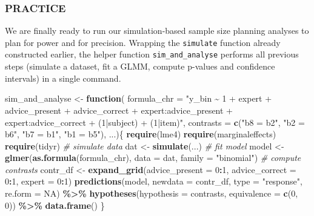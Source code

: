 \documentclass[
  man,floatsintext]{apa6}
\newenvironment{Shaded}{\begin{snugshade}}{\end{snugshade}}
\newcommand{\AttributeTok}[1]{\textcolor[rgb]{0.13,0.29,0.53}{#1}}
\newcommand{\CommentTok}[1]{\textcolor[rgb]{0.56,0.35,0.01}{\textit{#1}}}
\newcommand{\ConstantTok}[1]{\textcolor[rgb]{0.56,0.35,0.01}{#1}}
\newcommand{\ControlFlowTok}[1]{\textcolor[rgb]{0.13,0.29,0.53}{\textbf{#1}}}
\newcommand{\DecValTok}[1]{\textcolor[rgb]{0.00,0.00,0.81}{#1}}
\newcommand{\FunctionTok}[1]{\textcolor[rgb]{0.13,0.29,0.53}{\textbf{#1}}}
\newcommand{\NormalTok}[1]{#1}
\newcommand{\OtherTok}[1]{\textcolor[rgb]{0.56,0.35,0.01}{#1}}
\newcommand{\SpecialCharTok}[1]{\textcolor[rgb]{0.81,0.36,0.00}{\textbf{#1}}}
\newcommand{\StringTok}[1]{\textcolor[rgb]{0.31,0.60,0.02}{#1}}
\begin{document}
\hypertarget{practice-8}{%
\subsubsection{PRACTICE}\label{practice-8}}

We are finally ready to run our simulation-based sample size planning analyses to plan for power and for precision. Wrapping the \texttt{simulate} function already constructed earlier, the helper function \texttt{sim\_and\_analyse} performs all previous steps (simulate a dataset, fit a GLMM, compute p-values and confidence intervals) in a single command.

\begin{Shaded}
\begin{Highlighting}[]
\NormalTok{sim\_and\_analyse }\OtherTok{\textless{}{-}} \ControlFlowTok{function}\NormalTok{(}
  \AttributeTok{formula\_chr =} \StringTok{"y\_bin \textasciitilde{} 1 + expert + advice\_present + advice\_correct + }
\StringTok{    expert:advice\_present + expert:advice\_correct + (1|subject) + (1|item)"}\NormalTok{,}
  \AttributeTok{contrasts =} \FunctionTok{c}\NormalTok{(}\StringTok{"b8 = b2"}\NormalTok{, }\StringTok{"b2 = b6"}\NormalTok{, }\StringTok{"b7 = b1"}\NormalTok{, }\StringTok{"b1 = b5"}\NormalTok{), ...)\{}
  \FunctionTok{require}\NormalTok{(lme4)}
  \FunctionTok{require}\NormalTok{(marginaleffects)}
  \FunctionTok{require}\NormalTok{(tidyr)}
  \CommentTok{\# simulate data}
\NormalTok{  dat }\OtherTok{\textless{}{-}} \FunctionTok{simulate}\NormalTok{(...)}
  \CommentTok{\# fit model}
\NormalTok{  model }\OtherTok{\textless{}{-}} \FunctionTok{glmer}\NormalTok{(}\FunctionTok{as.formula}\NormalTok{(formula\_chr), }\AttributeTok{data =}\NormalTok{ dat, }\AttributeTok{family =} \StringTok{"binomial"}\NormalTok{)}
  \CommentTok{\# compute contrasts}
\NormalTok{  contr\_df }\OtherTok{\textless{}{-}} \FunctionTok{expand\_grid}\NormalTok{(}\AttributeTok{advice\_present =} \DecValTok{0}\SpecialCharTok{:}\DecValTok{1}\NormalTok{, }\AttributeTok{advice\_correct =} \DecValTok{0}\SpecialCharTok{:}\DecValTok{1}\NormalTok{,}
    \AttributeTok{expert =} \DecValTok{0}\SpecialCharTok{:}\DecValTok{1}\NormalTok{)}
  \FunctionTok{predictions}\NormalTok{(model, }\AttributeTok{newdata =}\NormalTok{ contr\_df, }\AttributeTok{type =} \StringTok{"response"}\NormalTok{, }\AttributeTok{re.form =} \ConstantTok{NA}\NormalTok{) }\SpecialCharTok{\%\textgreater{}\%}
    \FunctionTok{hypotheses}\NormalTok{(}\AttributeTok{hypothesis =}\NormalTok{ contrasts, }\AttributeTok{equivalence =} \FunctionTok{c}\NormalTok{(}\DecValTok{0}\NormalTok{, }\DecValTok{0}\NormalTok{)) }\SpecialCharTok{\%\textgreater{}\%}
    \FunctionTok{data.frame}\NormalTok{()}
\NormalTok{\}}
\end{Highlighting}
\end{Shaded}
\end{document}
